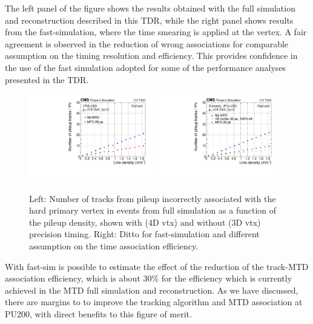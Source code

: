 The left panel of the figure shows the results obtained with the full
simulation and reconstruction described in this TDR, while the right
panel shows results from the fast-simulation, where the time smearing
is applied at the vertex. A fair agreement is observed in the
reduction of wrong associations for comparable assumption on the
timing resolution and efficiency. This provides confidence in the use of the fast
simulation adopted for some of the performance analyses presented in
the TDR.  

\begin{figure}[hbtp]
\centering
\includegraphics[width=0.48\textwidth]{fig/performance/purej/ForApproval/track_pu_vs_linden_nugun_nobdt.pdf}
\includegraphics[width=0.48\textwidth]{fig/performance/purej/ForApproval/nputracks_fastsim.pdf}
 \caption{Left: Number of tracks from pileup incorrectly 
   associated with the hard primary vertex in \ttbar events from full
   simulation as a function of the pileup density, shown with (4D vtx)
   and without (3D vtx) precision timing. Right: Ditto for
   fast-simulation and different assumption on the time association efficiency.}
   \label{fig:trkvtx}
\end{figure}

With fast-sim is possible to estimate the effect of the reduction of the track-MTD association efficiency, which is about 30\% for the efficiency which is currently achieved in the MTD full simulation and reconstruction. As we have discussed, there are margins to to improve the tracking algorithm and MTD association at PU200, with direct benefits to this figure of merit. 

